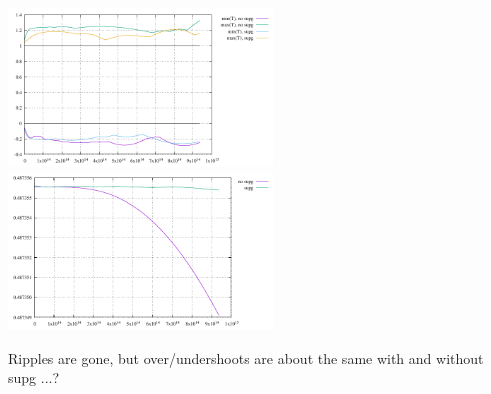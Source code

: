 \begin{center}
\includegraphics[width=7cm]{python_codes/fieldstone_43/results/experiment7/stats_T}
\includegraphics[width=7cm]{python_codes/fieldstone_43/results/experiment7/avrg_T}
\end{center}

Ripples are gone, but over/undershoots are about the same with and without supg ...?





